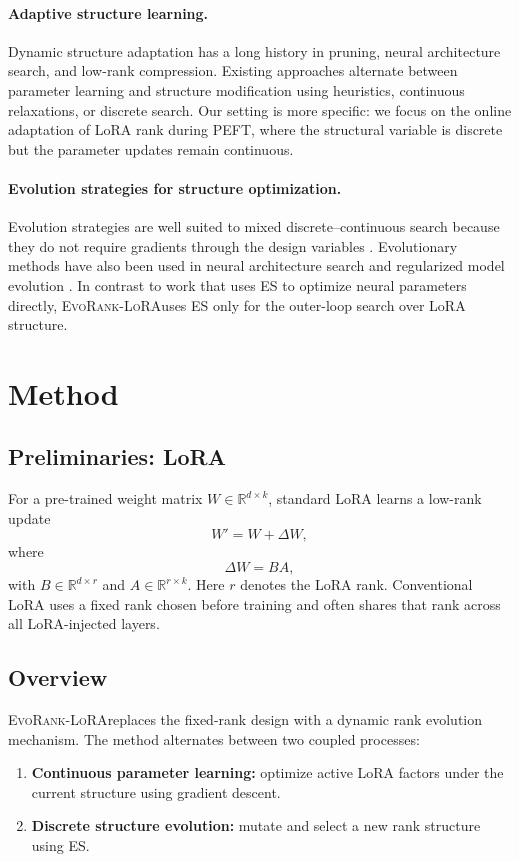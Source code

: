 \documentclass{article}
\newcommand{\method}{\textsc{EvoRank-LoRA}}
\begin{document}
\paragraph{Adaptive structure learning.}
Dynamic structure adaptation has a long history in pruning, neural architecture search, and low-rank compression. Existing approaches alternate between parameter learning and structure modification using heuristics, continuous relaxations, or discrete search. Our setting is more specific: we focus on the online adaptation of LoRA rank during PEFT, where the structural variable is discrete but the parameter updates remain continuous.

\paragraph{Evolution strategies for structure optimization.}
Evolution strategies are well suited to mixed discrete--continuous search because they do not require gradients through the design variables \citep{rechenberg1973evolutionsstrategie,schwefel1977numerische,salimans2017es}. Evolutionary methods have also been used in neural architecture search and regularized model evolution \citep{real2019regularized}. In contrast to work that uses ES to optimize neural parameters directly, \method uses ES only for the outer-loop search over LoRA structure.

\section{Method}
\label{sec:method}

\subsection{Preliminaries: LoRA}
For a pre-trained weight matrix $W \in \mathbb{R}^{d \times k}$, standard LoRA learns a low-rank update
\begin{equation}
    W' = W + \Delta W,
\end{equation}
where
\begin{equation}
    \Delta W = BA,
\end{equation}
with $B \in \mathbb{R}^{d \times r}$ and $A \in \mathbb{R}^{r \times k}$. Here $r$ denotes the LoRA rank. Conventional LoRA uses a fixed rank chosen before training and often shares that rank across all LoRA-injected layers.

\subsection{Overview}
\method replaces the fixed-rank design with a dynamic rank evolution mechanism. The method alternates between two coupled processes:
\begin{enumerate}[leftmargin=1.2em]
    \item \textbf{Continuous parameter learning:} optimize active LoRA factors under the current structure using gradient descent.
    \item \textbf{Discrete structure evolution:} mutate and select a new rank structure using ES.
\end{enumerate}
\end{document}

